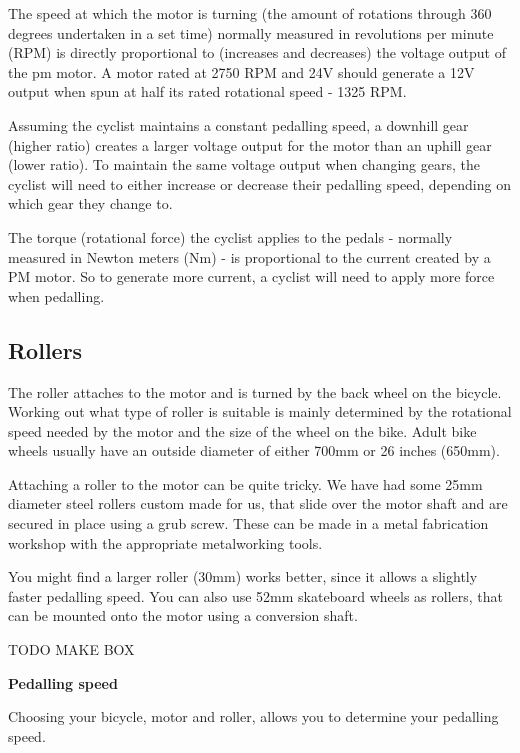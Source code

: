 \documentclass{article}
\theoremstyle{definition}
\theoremstyle{definition}
\theoremstyle{remark}
\begin{document}
    The speed at which the motor is turning (the amount of rotations through 360 degrees undertaken in a set time) normally measured in revolutions per minute (RPM) is directly proportional to (increases and decreases) the voltage output of the pm motor. A motor rated at 2750 RPM and 24V should generate a 12V output when spun at half its rated rotational speed - 1325 RPM.

    Assuming the cyclist maintains a constant pedalling speed, a downhill gear (higher ratio) creates a larger voltage output for the motor than an uphill gear (lower ratio). To maintain the same voltage output when changing gears, the cyclist will need to either increase or decrease their pedalling speed, depending on which gear they change to.

    The torque (rotational force) the cyclist applies to the pedals - normally measured in Newton meters (Nm) - is proportional to the current created by a PM motor. So to generate more current, a cyclist will need to apply more force when pedalling.
      

  {\color{blue}\subsection{Rollers}} %
  \label{sub:rollers}

    The roller attaches to the motor and is turned by the back wheel on the bicycle. Working out what type of roller is suitable is mainly determined by the rotational speed needed by the motor and the size of the wheel on the bike. Adult bike wheels usually have an outside diameter of either 700mm or 26 inches (650mm).

    Attaching a roller to the motor can be quite tricky. We have had some 25mm diameter steel rollers custom made for us, that slide over the motor shaft and are secured in place using a grub screw. These can be made in a metal fabrication workshop with the appropriate metalworking tools. 

    You might find a larger roller (30mm) works better, since it allows a slightly faster pedalling speed. You can also use 52mm skateboard wheels as rollers, that can be mounted onto the motor using a conversion shaft.

    TODO MAKE BOX

    \textbf{Pedalling speed}

    Choosing your bicycle, motor and roller, allows you to determine your pedalling speed. 
\end{document}
